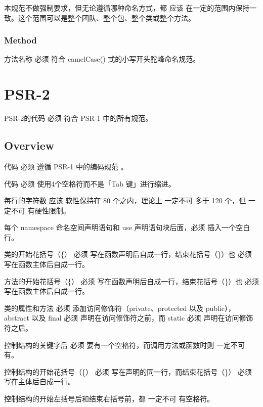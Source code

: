 本规范不做强制要求，但无论遵循哪种命名方式，都 应该 在一定的范围内保持一致。这个范围可以是整个团队、整个包、整个类或整个方法。

\subsection{Method}


方法名称 必须 符合 camelCase() 式的小写开头驼峰命名规范。

\chapter{PSR-2}

PSR-2的代码 必须 符合 PSR-1 中的所有规范。

\section{Overview}

\begin{compactitem}
\item 代码 必须 遵循 PSR-1 中的编码规范 。

\item 代码 必须 使用4个空格符而不是「Tab 键」进行缩进。

\item 每行的字符数 应该 软性保持在 80 个之内，理论上 一定不可 多于 120 个，但 一定不可 有硬性限制。

\item 每个 namespace 命名空间声明语句和 use 声明语句块后面，必须 插入一个空白行。

\item 类的开始花括号（\{） 必须 写在函数声明后自成一行，结束花括号（\}）也 必须 写在函数主体后自成一行。

\item 方法的开始花括号（\{） 必须 写在函数声明后自成一行，结束花括号（\}）也 必须 写在函数主体后自成一行。

\item 类的属性和方法 必须 添加访问修饰符（private、protected 以及 public），abstract 以及 final 必须 声明在访问修饰符之前，而 static 必须 声明在访问修饰符之后。

\item 控制结构的关键字后 必须 要有一个空格符，而调用方法或函数时则 一定不可 有。

\item 控制结构的开始花括号（\{） 必须 写在声明的同一行，而结束花括号（\}） 必须 写在主体后自成一行。

\item 控制结构的开始左括号后和结束右括号前，都 一定不可 有空格符。

\end{compactitem}




